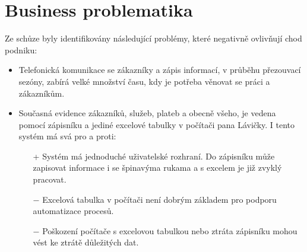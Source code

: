 \section{Business problematika}
Ze schůze byly identifikovány následující problémy, které negativně ovlivňují chod podniku:
\begin{itemize}
    \item Telefonická komunikace se zákazníky a zápis informací, v průběhu přezouvací sezóny, zabírá velké množství času, kdy je potřeba věnovat se práci a zákazníkům.
    \item Současná evidence zákazníků, služeb, plateb a obecně všeho, je vedena pomocí zápisníku a jediné excelové tabulky v počítači pana Lávičky. I tento systém má svá pro a proti:
    \begin{itemize}
        \item [+] Systém má jednoduché uživatelské rozhraní. Do zápisníku může zapisovat informace i se špinavýma rukama a s excelem je již zvyklý pracovat.
        \item [−] Excelová tabulka v počítači není dobrým základem pro podporu automatizace procesů.
        \item [−] Poškození počítače s excelovou tabulkou nebo ztráta zápisníku mohou vést ke ztrátě důležitých dat.
    \end{itemize}
\end{itemize}

